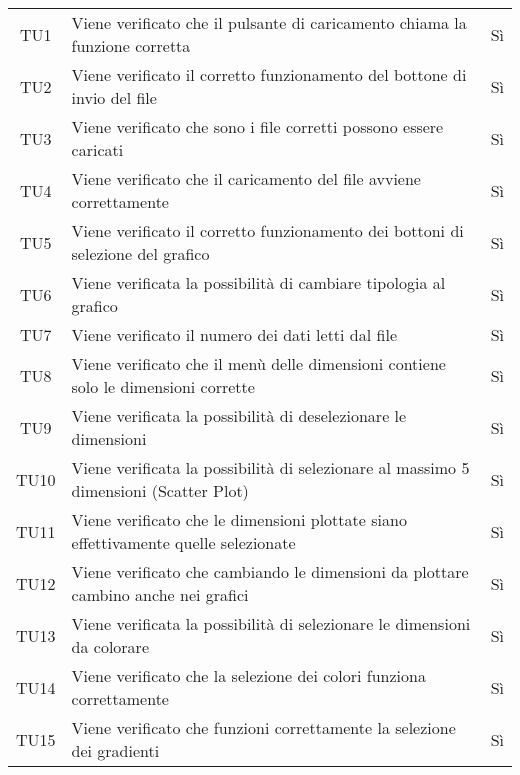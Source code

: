 \documentclass[../piano_di_qualifica.tex]{subfiles}
\begin{document}
\begin{center}
\begin{longtable}{|c|p{10cm}|c|}
		TU1               & Viene verificato che il pulsante di caricamento chiama la funzione corretta             & Sì                         \\
		TU2               & Viene verificato il corretto funzionamento del bottone di invio del file                & Sì                         \\
		TU3               & Viene verificato che sono i file corretti possono essere caricati                       & Sì                         \\
		TU4               & Viene verificato che il caricamento del file avviene correttamente                      & Sì                         \\
		TU5               & Viene verificato il corretto funzionamento dei bottoni di selezione del grafico         & Sì                         \\
		TU6               & Viene verificata la possibilità di cambiare tipologia al grafico                        & Sì                         \\
		TU7               & Viene verificato il numero dei dati letti dal file                                      & Sì                         \\
		TU8               & Viene verificato che il menù delle dimensioni contiene solo le dimensioni corrette      & Sì                         \\
		TU9               & Viene verificata la possibilità di deselezionare le dimensioni                          & Sì                         \\
		TU10              & Viene verificata la possibilità di selezionare al massimo 5 dimensioni (Scatter Plot)   & Sì                         \\
		TU11              & Viene verificato che le dimensioni plottate siano effettivamente quelle selezionate     & Sì                         \\
		TU12              & Viene verificato che cambiando le dimensioni da plottare cambino anche nei grafici      & Sì                         \\
		TU13              & Viene verificata la possibilità di selezionare le dimensioni da colorare                & Sì                         \\
		TU14              & Viene verificato che la selezione dei colori funziona correttamente                     & Sì                         \\
		TU15              & Viene verificato che funzioni correttamente la selezione dei gradienti                  & Sì                         \\

\end{longtable}
\end{center}
\end{document}
